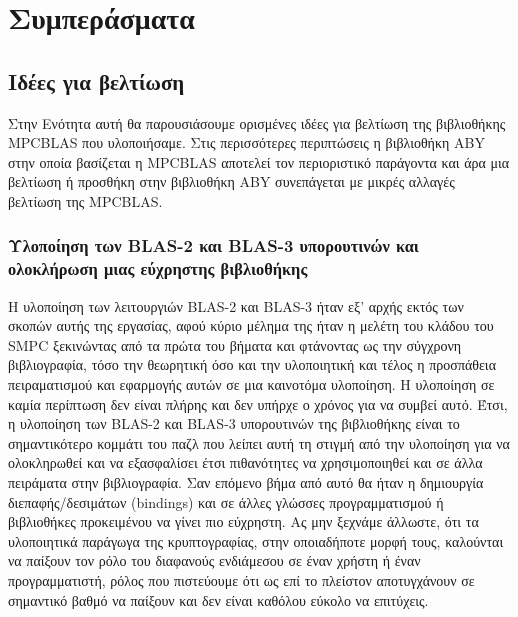 \section{Συμπεράσματα }



\subsection{Ιδέες για βελτίωση}

Στην Ενότητα αυτή θα παρουσιάσουμε ορισμένες ιδέες για βελτίωση της βιβλιοθήκης MPCBLAS που υλοποιήσαμε. Στις περισσότερες περιπτώσεις η βιβλιοθήκη ABY στην οποία βασίζεται η MPCBLAS αποτελεί τον περιοριστικό παράγοντα και άρα μια βελτίωση ή προσθήκη στην βιβλιοθήκη ABY συνεπάγεται με μικρές αλλαγές βελτίωση της MPCBLAS.

\subsubsection{Υλοποίηση των BLAS-2 και BLAS-3 υπορουτινών και ολοκλήρωση μιας εύχρηστης βιβλιοθήκης}
Η υλοποίηση των λειτουργιών BLAS-2 και BLAS-3 ήταν εξ' αρχής εκτός των σκοπών αυτής της εργασίας, αφού κύριο μέλημα της ήταν η μελέτη του κλάδου του SMPC ξεκινώντας από τα πρώτα του βήματα και φτάνοντας ως την σύγχρονη βιβλιογραφία, τόσο την θεωρητική όσο και την υλοποιητική και τέλος η προσπάθεια πειραματισμού και εφαρμογής αυτών σε μια καινοτόμα υλοποίηση. Η υλοποίηση σε καμία περίπτωση δεν είναι πλήρης και δεν υπήρχε ο χρόνος για να συμβεί αυτό. Έτσι, η υλοποίηση των BLAS-2 και BLAS-3 υπορουτινών της βιβλιοθήκης είναι το σημαντικότερο κομμάτι του παζλ που λείπει αυτή τη στιγμή από την υλοποίηση για να ολοκληρωθεί και να εξασφαλίσει έτσι πιθανότητες να χρησιμοποιηθεί και σε άλλα πειράματα στην βιβλιογραφία. Σαν επόμενο βήμα από αυτό θα ήταν η δημιουργία διεπαφής/δεσιμάτων (bindings) και σε άλλες γλώσσες προγραμματισμού ή βιβλιοθήκες προκειμένου να γίνει πιο εύχρηστη. Ας μην ξεχνάμε άλλωστε, ότι τα υλοποιητικά παράγωγα της κρυπτογραφίας, στην οποιαδήποτε μορφή τους, καλούνται να παίξουν τον ρόλο του διαφανούς ενδιάμεσου σε έναν χρήστη ή έναν προγραμματιστή, ρόλος που πιστεύουμε ότι ως επί το πλείστον αποτυγχάνουν σε σημαντικό βαθμό να παίξουν και δεν είναι καθόλου εύκολο να επιτύχεις.

